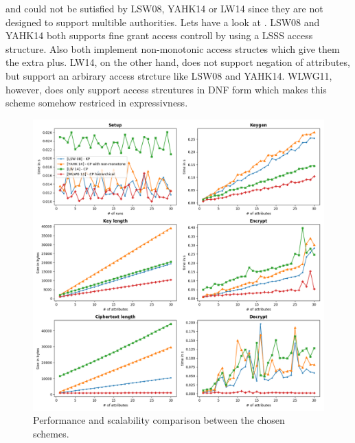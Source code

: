  and  could not be sutisfied by LSW08, YAHK14 or LW14 since they are not designed to support multible authorities. 
Lets have a look at . LSW08 and YAHK14 both supports fine grant access controll by using a LSSS access structure. Also both implement non-monotonic access structes which give them the extra plus. LW14, on the other hand, does not support negation of attributes, but support an arbirary access strcture like LSW08 and YAHK14. WLWG11, however, does only support access strcutures in DNF form which makes this scheme somehow restriced in expressivness. 

\begin{figure}[!ht]
\centering
    \includegraphics[width=1\linewidth]{img/basic_abe_comparisons.png}
    \caption{Performance and scalability comparison between the chosen schemes.}
    \label{fig:basic_abe_comparison}
\end{figure}


